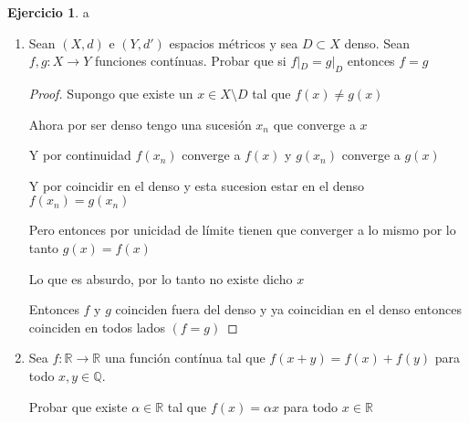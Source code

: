 \documentclass[11pt]{report}
\newcommand{\Q}{\mathbb{Q}}
\newcommand{\R}{\mathbb{R}}
\newcommand{\ra}{\rightarrow}
\theoremstyle{definition}
\newtheorem{ej}{Ejercicio}
\begin{document}
	\begin{ej}a

		\begin{enumerate}
			\item Sean $(X,d)$ e $(Y,d')$ espacios métricos y sea $D \subset X$ denso. Sean $f,g : X \ra Y$ funciones contínuas. Probar que si $f|_D = g|_D$ entonces $f = g$	

				\begin{proof}
					Supongo que existe un $x \in X\setminus D$ tal que $f(x) \neq g(x)$

					Ahora por ser denso tengo una sucesión $x_n $ que converge a $x$

					Y por continuidad $f(x_n)$ converge a $f(x)$ y $g(x_n)$ converge a $g(x)$

					Y por coincidir en el denso y esta sucesion estar en el denso $f(x_n) = g(x_n)$

					Pero entonces por unicidad de límite tienen que converger a lo mismo por lo tanto $g(x) = f(x)$

					Lo que es absurdo, por lo tanto no existe dicho $x$

					Entonces $f$ y $g$ coinciden fuera del denso y ya coincidian en el denso entonces coinciden en todos lados $(f =g)$
				\end{proof}
				
			\item Sea $f : \R \ra \R$ una función contínua tal que $f(x+y) = f(x) +f(y)$ para todo $x,y \in \Q$.
 
				Probar que existe $\alpha \in \R$ tal que $f(x)= \alpha x$ para todo $x \in \R$
		\end{enumerate}
	\end{ej}
	
\end{document}
